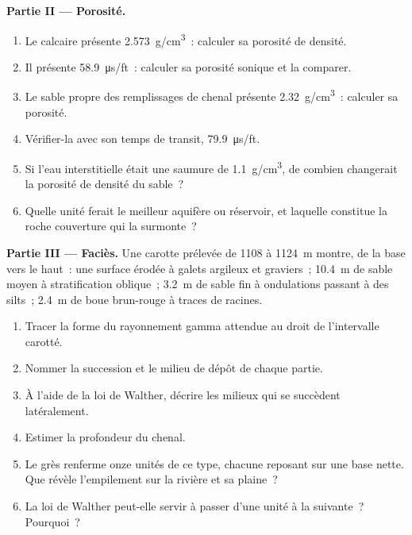 \begin{problem}
\medskip\noindent\textbf{Partie II --- Porosité.}
\begin{enumerate}[resume]
\item Le calcaire présente \qty{2.573}{g/cm^3}~: calculer sa porosité de densité.
\item Il présente \qty{58.9}{\micro\second/ft}~: calculer sa porosité sonique et
  la comparer.
\item Le sable propre des remplissages de chenal présente \qty{2.32}{g/cm^3}~: calculer
  sa porosité.
\item Vérifier-la avec son temps de transit, \qty{79.9}{\micro\second/ft}.
\item Si l'eau interstitielle était une saumure de \qty{1.1}{g/cm^3}, de combien changerait
  la porosité de densité du sable~?
\item Quelle unité ferait le meilleur aquifère ou réservoir, et laquelle
  constitue la roche couverture qui la surmonte~?
\end{enumerate}

\medskip\noindent\textbf{Partie III --- Faciès.} Une carotte prélevée de 1108 à
\qty{1124}{m} montre, de la base vers le haut~: une surface érodée à galets argileux et
graviers~; \qty{10.4}{m} de sable moyen à stratification oblique~; \qty{3.2}{m} de sable fin
à ondulations passant à des silts~; \qty{2.4}{m} de boue brun-rouge à traces de racines.
\begin{enumerate}[resume]
\item Tracer la forme du rayonnement gamma attendue au droit de l'intervalle carotté.
\item Nommer la succession et le milieu de dépôt de chaque partie.
\item À l'aide de la loi de Walther, décrire les milieux qui se succèdent latéralement.
\item Estimer la profondeur du chenal.
\item Le grès renferme onze unités de ce type, chacune reposant sur une base nette. Que
  révèle l'empilement sur la rivière et sa plaine~?
\item La loi de Walther peut-elle servir à passer d'une unité à la suivante~? Pourquoi~?
\end{enumerate}


\end{problem}
